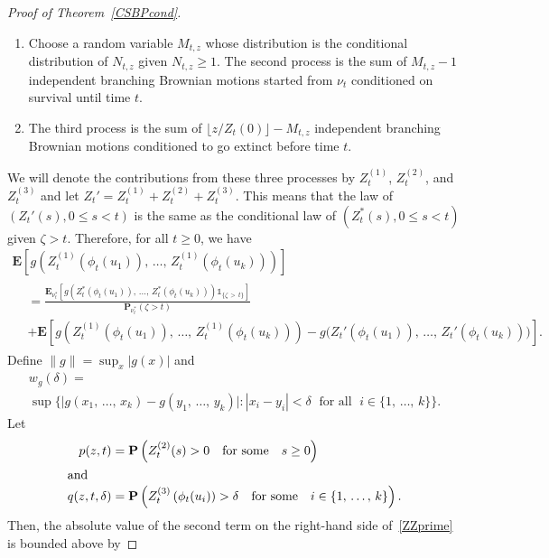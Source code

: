 \documentclass[10pt]{amsart}
\theoremstyle{definition}\newtheorem{defi}[theo]{Definition}\newtheorem{rema}[theo]{Remark}\newtheorem{exam}[theo]{Example}\newtheorem{exem}[theo]{Example}\newtheorem{nota}[theo]{Notation}
\newcommand*\E{\mathbf{E}}
\renewcommand*\P{\mathbf{P}}
\newcommand{\1} {\mathds{1}}
\begin{document}
\begin{proof}[Proof of Theorem~\ref{CSBPcond}]
\begin{enumerate}
\item Choose a random variable $M_{t,z}$ whose distribution is the conditional distribution of $N_{t,z}$ given $N_{t,z} \geq 1$. The second process is the sum of $M_{t,z} - 1$ independent branching Brownian motions started from $\nu_t$ conditioned on survival until time $t$.

\item The third process is the sum of $\lfloor z/Z_t(0) \rfloor - M_{t,z}$ independent branching Brownian motions conditioned to go extinct before time $t$.
\end{enumerate}
We will denote the contributions from these three processes by $Z_t^{(1)}$, $Z_t^{(2)}$, and $Z_t^{(3)}$ and let $Z_t' = Z_t^{(1)} + Z_t^{(2)} + Z_t^{(3)}$. This means that the law of $(Z_t'(s), 0 \leq s < t)$ is the same as the conditional law of $(Z_t^*(s), 0 \leq s < t)$ given $\zeta > t$. Therefore, for all $t \geq 0$, we have
\begin{multline}\label{ZZprime}
\E\left[g\left(Z_t^{(1)}\left(\phi_t(u_1)\right),\, \dots,\, Z_t^{(1)}\left(\phi_t(u_k)\right)\right)\right] \\
\begin{aligned}
&= \frac{\E_{\nu_t^*}\left[g\left(Z_t^*\left(\phi_t(u_1)\right),\, \dots,\, Z_t^*\left(\phi_t(u_k)\right)\right) \1_{\{\zeta\,>\,t\}}\right]}{\P_{\nu_t^*}(\zeta > t)}\\
&+ \E\left[g\left(Z_t^{(1)}\left(\phi_t(u_1)\right),\, \dots,\, Z_t^{(1)}\left(\phi_t(u_k)\right)\right) - g\big(Z_t'\left(\phi_t(u_1)\right),\, \dots,\, Z_t'\left(\phi_t(u_k)\right)\big)\right].
\end{aligned}
\end{multline}
Define $\|g\| = \sup_x |g(x)|$ and
\begin{multline*}
w_g(\delta)= \\
\sup\big\{\big|g\left(x_1,\, \dots,\, x_k\right) - g\left(y_1,\, \dots,\, y_k\right)\big|: \left|x_i - y_i\right| < \delta \;\text{ for all }\; i \in \{1, \,\dots,\,k\} \big\}.
\end{multline*}
Let
\begin{align*}
p(z,t) &= \P\left(Z_t^{(2)}(s) > 0\quad \text{for some}\quad s \geq 0\right)
\\
\intertext{and}
q(z,t,\delta) &= \P\left(Z_t^{(3)}\left(\phi_t(u_i)\right) > \delta \quad\text{for some}\quad i \in \{1,\, \dots,\, k\}\right).
\end{align*}
Then, the absolute value of the second term on the right-hand side of~\eqref{ZZprime} is bounded above by

\end{proof}
\end{document}
